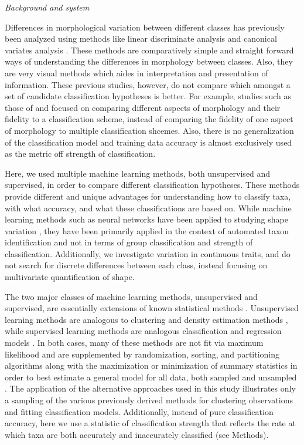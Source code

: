 \documentclass[12pt,letterpaper]{article}\usepackage{graphicx, color}
\renewcommand{\subsection}[1]{%
\bigskip
\begin{center}
\begin{large}
\normalfont\itshape #1
\end{large}
\end{center}}
\begin{document}
\subsection{Background and system}
Differences in morphological variation between different classes has previously been analyzed using methods like linear discriminate analysis and canonical variates analysis \citep{Zelditch2004,Mitteroecker2011,Polly2007a,Polly2003,Gunduz2007,Gaubert2005b,Demandt2009}. These methods are comparatively simple and straight forward ways of understanding the differences in morphology between classes. Also, they are very visual methods which aides in interpretation and presentation of information. These previous studies, however, do not compare which amongst a set of candidate classification hypotheses is better. For example, studies such as those of \citet{Caumul2005a} and \citet{Polly2007a} focused on comparing different aspects of morphology and their fidelity to a classification scheme, instead of comparing the fidelity of one aspect of morphology to multiple classification shcemes. Also, there is no generalization of the classification model and training data accuracy is almost exclusively used as the metric off strength of classification.

Here, we used multiple machine learning methods, both unsupervised and supervised, in order to compare different classification hypotheses. These methods provide different and unique advantages for understanding how to classify taxa, with what accuracy, and what these classifications are based on. While machine learning methods such as neural networks have been applied to studying shape variation \citep{MacLeod2007}, they have been primarily applied in the context of automated taxon identification and not in terms of group classification and strength of classification. Additionally, we investigate variation in continuous traits, and do not search for discrete differences between each class, instead focusing on multivariate quantification of shape.

The two major classes of machine learning methods, unsupervised and supervised, are essentially extensions of known statistical methods \citep{Hastie2009}. Unsupervised learning methods are analogous to clustering and density estimation methods \citep{Kaufman1990}, while supervised learning methods are analogous classification and regression models \citep{Breiman1984}. In both cases, many of these methods are not fit via maximum likelihood and are supplemented by randomization, sorting, and partitioning algorithms along with the maximization or minimization of summary statistics in order to best estimate a general model for all data, both sampled and unsampled \citep{Hastie2009}. The application of the alternative approaches used in this study illustrates only a sampling of the various previously derived methods for clustering observations and fitting classification models. 
Additionally, instead of pure classification accuracy, here we use a statistic of classification strength that reflects the rate at which taxa are both accurately and inaccurately classified (see Methods).
\end{document}
